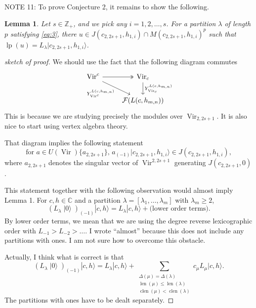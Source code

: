 \documentclass[a4paper, 12pt, reqno]{amsart}
\newtheorem{lemma}[theorem]{Lemma}
\theoremstyle{remark}
\DeclareMathOperator{\Vir}{Vir}
\DeclareMathOperator{\len}{len}
\DeclareMathOperator{\clen}{clen}
\DeclareMathOperator{\vac}{|0\rangle}
\DeclareMathOperator{\lp}{lp}
\begin{document}
NOTE 11: To prove Conjecture 2, it remains to show the following.
\begin{lemma}
  \label{lmm:2}
  Let $s \in \mathbb{Z}_+$, and we pick any $i = 1, 2, \dots, s$.
  For a partition $\lambda$ of length $p$ satisfying \eqref{eq:3}, there $u \in J(c_{2, 2s + 1}, h_{1, i}) \cap M(c_{2, 2s + 1}, h_{1, i})^p$ such that $\lp(u) = L_{\lambda}|c_{2, 2s + 1}, h_{1, i}\rangle$.
\end{lemma}

\begin{proof}[sketch of proof]
  We should use the fact that the following diagram commutes
  \begin{equation*}
    \begin{tikzcd}
      \Vir^c \arrow[r, two heads] \arrow[rd, "{Y^{L(c, h_{m, n})}_{\Vir^c}}"'] & {\Vir_c} \arrow[d, "{Y^{L(c, h_{m, n})}_{\Vir_c}}"] \\
      & {\mathcal{F}(L(c, h_{m, n}))}
    \end{tikzcd}
  \end{equation*}
  This is because we are studying precisely the modules over $\Vir_{2, 2s + 1}$.
  It is also nice to start using vertex algebra theory.

  That diagram implies the following statement
  \begin{equation*}
    \text{for $a \in U(\Vir)\{a_{2, 2s + 1}\}$, $a_{(-1)}|c_{2, 2s + 1}, h_{1, i}\rangle \in J(c_{2, 2s + 1}, h_{1, i})$},
  \end{equation*}
  where $a_{2, 2s + 1}$ denotes the singular vector of $\Vir^{2, 2s + 1}$ generating $J(c_{2, 2s + 1}, 0)$.

  This statement together with the following observation would almost imply Lemma 1.
  For $c, h \in \mathbb{C}$ and a partition $\lambda = [\lambda_1, \dots, \lambda_m]$ with $\lambda_m \ge 2$,
  \begin{equation*}
    (L_{\lambda}\vac)_{(-1)}|c, h\rangle = L_{\lambda}|c, h\rangle + \text{(lower order terms)}.
  \end{equation*}
  By lower order terms, we mean that we are using the degree reverse lexicographic order with $L_{-1} > L_{-2} > \dots$.
  I wrote ``almost'' because this does not include any partitions with ones.
  I am not sure how to overcome this obstacle.

  Actually, I think what is correct is that
  \begin{equation*}
    (L_{\lambda}\vac)_{(-1)}|c, h\rangle = L_{\lambda}|c, h\rangle + \sum_{\substack{\Delta(\mu) = \Delta(\lambda) \\ \len(\mu) \le \len(\lambda) \\ \clen(\mu) < \clen(\lambda)}}c_{\mu}L_{\mu}|c, h\rangle.
  \end{equation*}
  The partitions with ones have to be dealt separately.
\end{proof}
\end{document}
